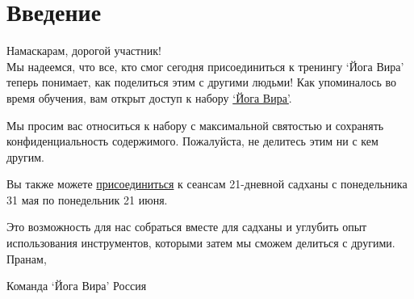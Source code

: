 \section{Введение}
Намаскарам, дорогой участник!
\\

Мы надеемся, что все, кто смог сегодня присоединиться к тренингу ‘Йога Вира’ теперь понимает, как поделиться этим с другими людьми!
Как упоминалось во время обучения, вам открыт доступ к набору \href{https://sites.google.com/ishafoundation.org/yogaveera-russian}{‘Йога Вира’}.

Мы просим вас относиться к набору с максимальной святостью и сохранять конфиденциальность содержимого. Пожалуйста, не делитесь этим ни с кем другим.
 
Вы также можете \href{http://ishaeu.org/21day-sadhana-RU}{присоединиться} к сеансам 21-дневной садханы с понедельника 31 мая по понедельник 21 июня.

Это возможность для нас собраться вместе для садханы и углубить опыт использования инструментов, которыми затем мы сможем делиться с другими.
\\

Пранам,

Команда ‘Йога Вира’ Россия
